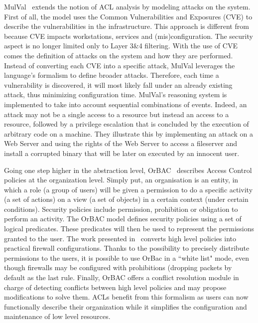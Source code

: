 MulVal~\cite{mulval-Ou2013} extends the notion of ACL analysis by modeling attacks on the system. First of all, the model uses the Common Vulnerabilities and Exposures (CVE) to describe the vulnerabilities in the infrastructure. This approach is different from~\cite{Matousek2008} because CVE impacts workstations, services and (mis)configuration. The security aspect is no longer limited only to Layer 3\&4 filtering.
With the use of CVE comes the definition of attacks on the system and how they are performed.
Instead of converting each CVE into a specific attack, MulVal leverages the language's formalism to define broader attacks.
Therefore, each time a vulnerability is discovered, it will most likely fall under an already existing attack, thus minimizing configuration time.
MulVal's reasoning system is implemented to take into account sequential combinations of events.
Indeed, an attack may not be a single access to a resource but instead an access to a resource, followed by a privilege escalation that is concluded by the execution of arbitrary code on a machine.
They illustrate this by implementing an attack on a Web Server and using the rights of the Web Server to access a fileserver and install a corrupted binary that will be later on executed by an innocent user.

Going one step higher in the abstraction level, OrBAC~\cite{orbac} describes Access Control policies at the organization level. Simply put, an organisation is an entity, in which a role (\ie a group of users) will be given a permission to do a specific activity (\ie a set of actions) on a view (\ie a set of objects) in a certain context (\ie under certain conditions).
Security policies include permission, prohibition or obligation to perform an activity.
The OrBAC model defines security policies using a set of logical predicates. These predicates will then be used to represent the permissions granted to the user.
The work presented in~\cite{Cuppens} converts high level policies into practical firewall configurations. Thanks to the possibility to precisely distribute permissions to the users, it is possible to use OrBac in a ``white list" mode, even though firewalls may be configured with prohibitions (\ie dropping packets by default as the last rule.
Finally, OrBAC offers a conflict resolution module in charge of detecting conflicts between high level policies and may propose modifications to solve them.
ACLs benefit from this formalism as users can now functionally describe their organization while it simplifies the configuration and maintenance of low level resources.


